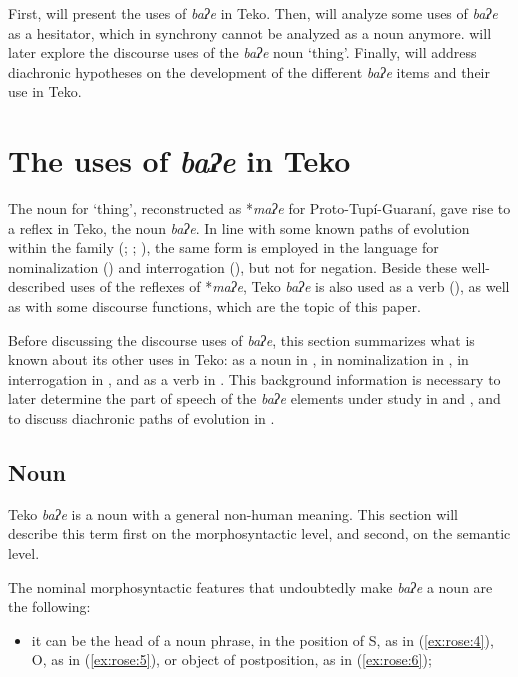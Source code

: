 \documentclass[output=paper]{langscibook}
\begin{document}
First,  will present the uses of \textit{baʔe} in Teko. Then,  will analyze some uses of \textit{baʔe} as a hesitator, which in synchrony cannot be analyzed as a noun anymore.  will later explore the discourse uses of the \textit{baʔe} noun ‘thing’. Finally,  will address diachronic hypotheses on the development of the different \textit{baʔe} items and their use in Teko.

\section{The uses of \textit{baʔe} in Teko}
\label{sec:rose:2}
The noun for ‘thing’, reconstructed as *\textit{maʔe} for Proto-Tupí-Guaraní, gave rise to a reflex in Teko, the noun \textit{baʔe}. In line with some known paths of evolution within the family (\citealt{Dietrich1994}; \citealt{Jensen1998}; \citealt{AuweraAuwera2021}), the same form is employed in the language for nominalization () and interrogation (), but not for negation. Beside these well-described uses of the reflexes of *\textit{maʔe}, Teko \textit{baʔe} is also used as a verb (), as well as with some discourse functions, which are the topic of this paper. 

Before discussing the discourse uses of \textit{baʔe}, this section summarizes what is known about its other uses in Teko: as a noun in , in nominalization in , in interrogation in , and as a verb in . This background information is necessary to later determine the part of speech of the \textit{baʔe} elements under study in  and , and to discuss diachronic paths of evolution in .

\subsection{Noun}
\label{sec:rose:2.1}
Teko \textit{baʔe} is a noun with a general non-human meaning. This section will describe this term first on the morphosyntactic level, and second, on the semantic level.

The nominal morphosyntactic features that undoubtedly make \textit{baʔe} a noun are the following:

\begin{itemize}
\item it can be the head of a noun phrase, in the position of S, as in (\ref{ex:rose:4}), O, as in (\ref{ex:rose:5}), or object of postposition, as in (\ref{ex:rose:6});
\end{itemize}
\end{document}
